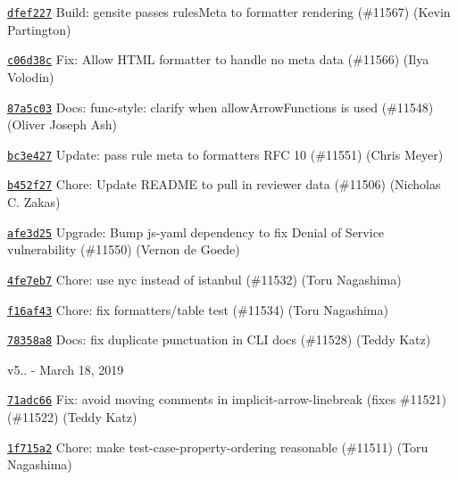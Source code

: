 \begin{DoxyItemize}
\item \href{https://github.com/eslint/eslint/commit/dfef227091955a2f8f3fa8c76ad79de8a77e7955}{\texttt{ {\ttfamily dfef227}}} Build\+: gensite passes rules\+Meta to formatter rendering (\#11567) (Kevin Partington)
\item \href{https://github.com/eslint/eslint/commit/c06d38c81bd9203c904587396a65d3c8cc7f2944}{\texttt{ {\ttfamily c06d38c}}} Fix\+: Allow HTML formatter to handle no meta data (\#11566) (Ilya Volodin)
\item \href{https://github.com/eslint/eslint/commit/87a5c034977cf4538ff3539d2f8776a987c5942a}{\texttt{ {\ttfamily 87a5c03}}} Docs\+: {\ttfamily func-\/style}\+: clarify when {\ttfamily allow\+Arrow\+Functions} is used (\#11548) (Oliver Joseph Ash)
\item \href{https://github.com/eslint/eslint/commit/bc3e427ee8875c53eac6b6762884b50074f1adfc}{\texttt{ {\ttfamily bc3e427}}} Update\+: pass rule meta to formatters RFC 10 (\#11551) (Chris Meyer)
\item \href{https://github.com/eslint/eslint/commit/b452f270bc0b523d88d5d827c95be3096f82e99d}{\texttt{ {\ttfamily b452f27}}} Chore\+: Update README to pull in reviewer data (\#11506) (Nicholas C. Zakas)
\item \href{https://github.com/eslint/eslint/commit/afe3d25f8afb88caee43f7202d0eb96f33a92a6b}{\texttt{ {\ttfamily afe3d25}}} Upgrade\+: Bump js-\/yaml dependency to fix Denial of Service vulnerability (\#11550) (Vernon de Goede)
\item \href{https://github.com/eslint/eslint/commit/4fe7eb7cecdc2395cf1eeaa20921bda8460b00c2}{\texttt{ {\ttfamily 4fe7eb7}}} Chore\+: use nyc instead of istanbul (\#11532) (Toru Nagashima)
\item \href{https://github.com/eslint/eslint/commit/f16af439694aab473c647d8fae47c402bd489447}{\texttt{ {\ttfamily f16af43}}} Chore\+: fix formatters/table test (\#11534) (Toru Nagashima)
\item \href{https://github.com/eslint/eslint/commit/78358a8f66e95c4fcc921f2497e8a5ec5f1537ec}{\texttt{ {\ttfamily 78358a8}}} Docs\+: fix duplicate punctuation in CLI docs (\#11528) (Teddy Katz)
\end{DoxyItemize}

v5.. -\/ March 18, 2019


\begin{DoxyItemize}
\item \href{https://github.com/eslint/eslint/commit/71adc665b9649b173adc76f80723b8de20664ae1}{\texttt{ {\ttfamily 71adc66}}} Fix\+: avoid moving comments in implicit-\/arrow-\/linebreak (fixes \#11521) (\#11522) (Teddy Katz)
\item \href{https://github.com/eslint/eslint/commit/1f715a20c145d8ccc38f3310afccd838495d09d4}{\texttt{ {\ttfamily 1f715a2}}} Chore\+: make test-\/case-\/property-\/ordering reasonable (\#11511) (Toru Nagashima)
\end{DoxyItemize}

